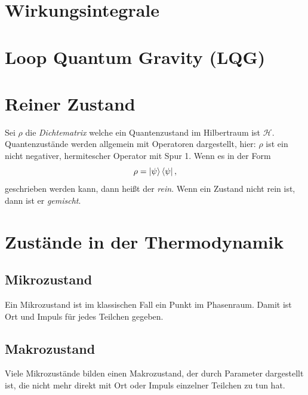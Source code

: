 \documentclass[ngerman]{scrartcl}
\newcommand{\Hil}{\mathcal{H}}
\begin{document}
\section{Wirkungsintegrale}

\section{Loop Quantum Gravity (LQG)}	

\appendix
\section{Reiner Zustand} \label{ReinerZustandA}
Sei $\rho$ die \textit{Dichtematrix} welche ein Quantenzustand im Hilbertraum ist $\Hil$. Quantenzustände werden allgemein mit Operatoren dargestellt, hier: $\rho$ ist ein nicht negativer, hermitescher Operator mit Spur 1. Wenn es in der Form
\begin{equation}
\rho=\ket{\psi} \bra{\psi},
\end{equation}
geschrieben werden kann, dann heißt der \textit{rein}. Wenn ein Zustand nicht rein ist, dann ist er \textit{gemischt}.

\section{Zustände in der Thermodynamik}

\subsection*{Mikrozustand}
Ein Mikrozustand ist im klassischen Fall ein Punkt im Phasenraum. Damit ist Ort und Impuls für jedes Teilchen gegeben.

\subsection*{Makrozustand}
Viele Mikrozustände bilden einen Makrozustand, der durch Parameter dargestellt ist, die nicht mehr direkt mit Ort oder Impuls einzelner Teilchen zu tun hat.

\newpage
\printbibliography
\end{document}
